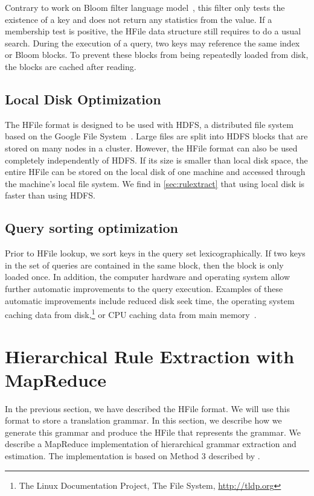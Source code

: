 Contrary to
work on Bloom filter language
model~\citep{talbot-osborne:2007:ACL,talbot-osborne:2007:EMNLP-CoNLL}, this
filter only tests the existence of a key and does not return any statistics from
the value. If a membership test is positive, the HFile data structure still
requires to do a usual search. During the execution of a query, two keys may
reference the same index or Bloom blocks. To prevent these blocks from being
repeatedly loaded from disk, the blocks are cached after reading.

\subsection{Local Disk Optimization}

The HFile format is designed to be used with HDFS, a distributed file system
based on the Google File System~\citep{ghemawat-gobioff-leung:2003:OSP}. Large
files are split into HDFS blocks that are stored on many nodes in a cluster.
However, the HFile format can also be used completely independently of HDFS. If
its size is smaller than local disk space, the entire HFile can be stored on the local
disk of one machine and accessed through the machine's local file system. We
find in \autoref{sec:rulextract} that using local disk
is faster than using HDFS.

\subsection{Query sorting optimization}

Prior to HFile lookup, we sort keys in the query set lexicographically. If two
keys in the set of queries are contained in the same block, then the block is
only loaded once. In addition, the computer hardware and operating system allow
further automatic improvements to the query execution. Examples of these
automatic improvements include reduced disk seek time, the operating system
caching data from
disk,\footnote{The Linux Documentation Project, The File System, \url{http://tldp.org}}
or CPU caching data from main memory~\citep{patterson-hennessy:2005:COA}.

\section{Hierarchical Rule Extraction with MapReduce}

In the previous section, we have described the HFile format. We will use
this format to store a translation grammar. In this
section, we describe how we generate this grammar and produce the HFile
that represents the grammar.
We describe a MapReduce implementation of hierarchical grammar
extraction and estimation. The implementation is based on Method 3 described by
\citet{dyer-cordova-mont-lin:2008:WMT}.

